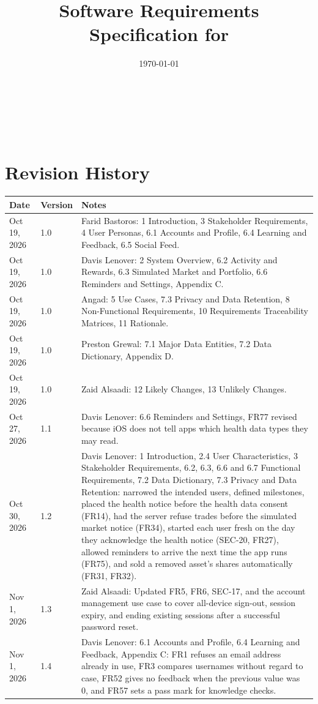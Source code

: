 \documentclass[12pt]{article}
\begin{document}
\title{Software Requirements Specification for \progname{}} 
\author{\authname}
\date{\today}
	
\maketitle
\thispagestyle{empty}

~\newpage


\tableofcontents

~\newpage

\section*{Revision History}

\begin{tabularx}{\textwidth}{p{3cm}p{2cm}X}
  \toprule {\bf Date} & {\bf Version} & {\bf Notes}\\
\midrule
Oct 19, 2026 & 1.0 & Farid Bastoros: 1 Introduction, 3 Stakeholder
Requirements, 4 User Personas, 6.1 Accounts and Profile, 6.4 Learning and
Feedback, 6.5 Social Feed.\\
Oct 19, 2026 & 1.0 & Davis Lenover: 2 System Overview, 6.2 Activity and
Rewards, 6.3 Simulated Market and Portfolio, 6.6 Reminders and Settings,
Appendix C.\\
Oct 19, 2026 & 1.0 & Angad: 5 Use Cases, 7.3 Privacy and Data Retention,
8 Non-Functional Requirements, 10 Requirements Traceability Matrices,
11 Rationale.\\
Oct 19, 2026 & 1.0 & Preston Grewal: 7.1 Major Data Entities, 7.2 Data
Dictionary, Appendix D.\\
Oct 19, 2026 & 1.0 & Zaid Alsaadi: 12 Likely Changes, 13 Unlikely Changes.\\
Oct 27, 2026 & 1.1 & Davis Lenover: 6.6 Reminders and Settings, FR77
revised because iOS does not tell apps which health data types they may
read.\\
Oct 30, 2026 & 1.2 & Davis Lenover: 1 Introduction, 2.4 User Characteristics,
3 Stakeholder Requirements, 6.2, 6.3, 6.6 and 6.7 Functional Requirements, 7.2
Data Dictionary, 7.3 Privacy and Data Retention: narrowed the intended users,
defined milestones, placed the health notice before the health data consent
(FR14), had the server refuse trades before the simulated market notice (FR34),
started each user fresh on the day they acknowledge the health notice (SEC-20,
FR27), allowed reminders to arrive the next time the app runs (FR75), and sold a
removed asset's shares automatically (FR31, FR32).\\
Nov 1, 2026 & 1.3 & Zaid Alsaadi: Updated FR5, FR6, SEC-17, and the
account management use case to cover all-device sign-out, session
expiry, and ending existing sessions after a successful password reset.\\
Nov 1, 2026 & 1.4 & Davis Lenover: 6.1 Accounts and Profile, 6.4 Learning and
Feedback, Appendix C: FR1 refuses an email address already in use, FR3 compares
usernames without regard to case, FR52 gives no feedback when the previous value
was 0, and FR57 sets a pass mark for knowledge checks.\\
\bottomrule
\end{tabularx}
\end{document}
